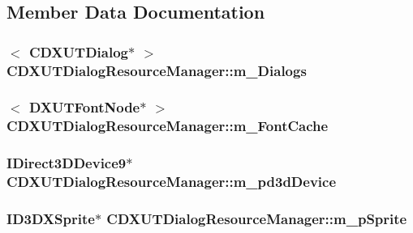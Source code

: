 \subsection{Member Data Documentation}
\hypertarget{class_c_d_x_u_t_dialog_resource_manager_a6da7f26183db3fddce10b2e536dc066b}{
\subsubsection[{m\_\-Dialogs}]{$<$ {\bf CDXUTDialog}$\ast$ $>$ {\bf CDXUTDialogResourceManager::m\_\-Dialogs}}}
\label{class_c_d_x_u_t_dialog_resource_manager_a6da7f26183db3fddce10b2e536dc066b}
\hypertarget{class_c_d_x_u_t_dialog_resource_manager_a9fb68b8f91a2ac42376a3c00259de62d}{
\subsubsection[{m\_\-FontCache}]{$<$ {\bf DXUTFontNode}$\ast$ $>$ {\bf CDXUTDialogResourceManager::m\_\-FontCache}}}
\label{class_c_d_x_u_t_dialog_resource_manager_a9fb68b8f91a2ac42376a3c00259de62d}
\hypertarget{class_c_d_x_u_t_dialog_resource_manager_a8a67a0baff653310af724f8ec0b6f6ad}{
\subsubsection[{m\_\-pd3dDevice}]{\setlength{\rightskip}{0pt plus 5cm}IDirect3DDevice9$\ast$ {\bf CDXUTDialogResourceManager::m\_\-pd3dDevice}}}
\label{class_c_d_x_u_t_dialog_resource_manager_a8a67a0baff653310af724f8ec0b6f6ad}
\hypertarget{class_c_d_x_u_t_dialog_resource_manager_a36b8710e919e00692dbfd4683b2529eb}{
\subsubsection[{m\_\-pSprite}]{\setlength{\rightskip}{0pt plus 5cm}ID3DXSprite$\ast$ {\bf CDXUTDialogResourceManager::m\_\-pSprite}}}
